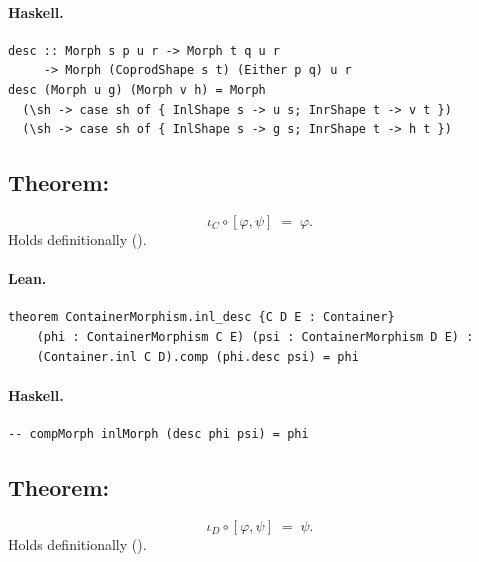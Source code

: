 \documentclass[11pt,a4paper]{article}
\begin{document}
\paragraph{Haskell.}
\begin{lstlisting}[style=haskell]
desc :: Morph s p u r -> Morph t q u r
     -> Morph (CoprodShape s t) (Either p q) u r
desc (Morph u g) (Morph v h) = Morph
  (\sh -> case sh of { InlShape s -> u s; InrShape t -> v t })
  (\sh -> case sh of { InlShape s -> g s; InrShape t -> h t })
\end{lstlisting}


\subsection{Theorem: }

\begin{thm}
\[
  \iota_C \circ [\varphi, \psi] \;=\; \varphi.
\]
Holds definitionally ().
\end{thm}

\paragraph{Lean.}
\begin{lstlisting}[style=lean]
theorem ContainerMorphism.inl_desc {C D E : Container}
    (phi : ContainerMorphism C E) (psi : ContainerMorphism D E) :
    (Container.inl C D).comp (phi.desc psi) = phi
\end{lstlisting}

\paragraph{Haskell.}
\begin{lstlisting}[style=haskell]
-- compMorph inlMorph (desc phi psi) = phi
\end{lstlisting}


\subsection{Theorem: }

\begin{thm}
\[
  \iota_D \circ [\varphi, \psi] \;=\; \psi.
\]
Holds definitionally ().
\end{thm}
\end{document}
